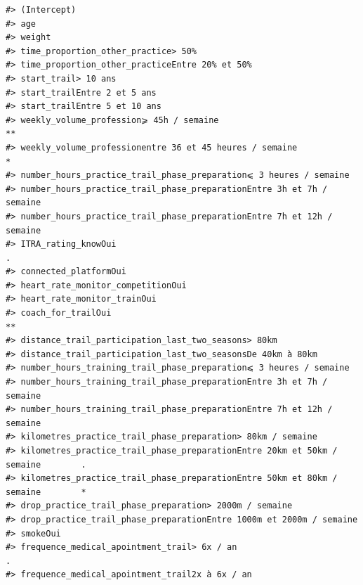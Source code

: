 \documentclass[
]{article}
\begin{document}
\begin{verbatim}
#> (Intercept)                                                                      
#> age                                                                              
#> weight                                                                           
#> time_proportion_other_practice> 50%                                              
#> time_proportion_other_practiceEntre 20% et 50%                                   
#> start_trail> 10 ans                                                              
#> start_trailEntre 2 et 5 ans                                                      
#> start_trailEntre 5 et 10 ans                                                     
#> weekly_volume_profession⩾ 45h / semaine                                        **
#> weekly_volume_professionentre 36 et 45 heures / semaine                        * 
#> number_hours_practice_trail_phase_preparation⩽ 3 heures / semaine                
#> number_hours_practice_trail_phase_preparationEntre 3h et 7h / semaine            
#> number_hours_practice_trail_phase_preparationEntre 7h et 12h / semaine           
#> ITRA_rating_knowOui                                                            . 
#> connected_platformOui                                                            
#> heart_rate_monitor_competitionOui                                                
#> heart_rate_monitor_trainOui                                                      
#> coach_for_trailOui                                                             **
#> distance_trail_participation_last_two_seasons> 80km                              
#> distance_trail_participation_last_two_seasonsDe 40km à 80km                      
#> number_hours_training_trail_phase_preparation⩽ 3 heures / semaine                
#> number_hours_training_trail_phase_preparationEntre 3h et 7h / semaine            
#> number_hours_training_trail_phase_preparationEntre 7h et 12h / semaine           
#> kilometres_practice_trail_phase_preparation> 80km / semaine                      
#> kilometres_practice_trail_phase_preparationEntre 20km et 50km / semaine        . 
#> kilometres_practice_trail_phase_preparationEntre 50km et 80km / semaine        * 
#> drop_practice_trail_phase_preparation> 2000m / semaine                           
#> drop_practice_trail_phase_preparationEntre 1000m et 2000m / semaine              
#> smokeOui                                                                         
#> frequence_medical_apointment_trail> 6x / an                                    . 
#> frequence_medical_apointment_trail2x à 6x / an                                   

\end{verbatim}
\end{document}
